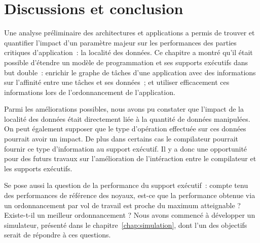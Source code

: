 \section*{Discussions et conclusion}

Une analyse préliminaire des architectures et applications a permis de trouver et quantifier l'impact d'un paramètre majeur sur les performances des parties critiques d'application~: la localité des données.
Ce chapitre a montré qu'il était possible d'étendre un modèle de programmation et ses supports exécutifs dans but double~: enrichir le graphe de tâches d'une application avec des informations sur l'affinité entre une tâches et ses données~; et utiliser efficacement ces informations lors de l'ordonnancement de l'application.

Parmi les améliorations possibles, nous avons pu constater que l'impact de la localité des données était directement liée à la quantité de données manipulées.
On peut également supposer que le type d'opération effectuée sur ces données pourrait avoir un impact.
De plus dans certains cas le compilateur pourrait fournir ce type d'information au support exécutif.
Il y a donc une opportunité pour des futurs travaux sur l'amélioration de l'intéraction entre le compilateur et les supports exécutifs.

Se pose aussi la question de la performance du support exécutif~: compte tenu des performances de référence des noyaux, est-ce que la performance obtenue via un ordonnancement par vol de travail est proche du maximum atteignable ?
Existe-t-il un meilleur ordonnancement ?
Nous avons commencé à développer un simulateur, présenté dans le chapitre~\ref{chap:simulation}, dont l'un des objectifs serait de répondre à ces questions.
